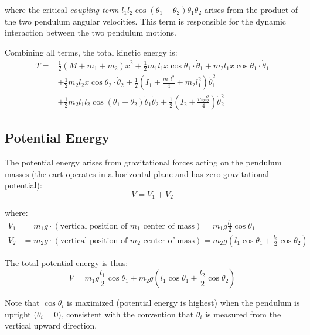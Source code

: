 where the critical \textit{coupling term} $l_1 l_2 \cos(\theta_1 - \theta_2) \dot{\theta}_1 \dot{\theta}_2$ arises from the product of the two pendulum angular velocities. This term is responsible for the dynamic interaction between the two pendulum motions.

Combining all terms, the total kinetic energy is:
\begin{align}
T = &\frac{1}{2}(M + m_1 + m_2)\dot{x}^2 + \frac{1}{2}m_1 l_1 \dot{x} \cos\theta_1 \cdot \dot{\theta}_1 + m_2 l_1 \dot{x} \cos\theta_1 \cdot \dot{\theta}_1 \nonumber \\
&+ \frac{1}{2}m_2 l_2 \dot{x} \cos\theta_2 \cdot \dot{\theta}_2 + \frac{1}{2}\left(I_1 + \frac{m_1 l_1^2}{4} + m_2 l_1^2\right)\dot{\theta}_1^2 \nonumber \\
&+ \frac{1}{2}m_2 l_1 l_2 \cos(\theta_1 - \theta_2)\dot{\theta}_1 \dot{\theta}_2 + \frac{1}{2}\left(I_2 + \frac{m_2 l_2^2}{4}\right)\dot{\theta}_2^2
\label{eq:kinetic_complete}
\end{align}

\subsection{Potential Energy}

The potential energy arises from gravitational forces acting on the pendulum masses (the cart operates in a horizontal plane and has zero gravitational potential):
\begin{equation}
V = V_1 + V_2
\label{eq:potential_total}
\end{equation}

where:
\begin{align}
V_1 &= m_1 g \cdot (\text{vertical position of } m_1 \text{ center of mass}) = m_1 g \frac{l_1}{2}\cos\theta_1 \label{eq:potential_pend1} \\
V_2 &= m_2 g \cdot (\text{vertical position of } m_2 \text{ center of mass}) = m_2 g \left( l_1\cos\theta_1 + \frac{l_2}{2}\cos\theta_2 \right) \label{eq:potential_pend2}
\end{align}

The total potential energy is thus:
\begin{equation}
V = m_1 g \frac{l_1}{2}\cos\theta_1 + m_2 g \left( l_1\cos\theta_1 + \frac{l_2}{2}\cos\theta_2 \right)
\label{eq:potential_complete}
\end{equation}

Note that $\cos\theta_i$ is maximized (potential energy is highest) when the pendulum is upright ($\theta_i = 0$), consistent with the convention that $\theta_i$ is measured from the vertical upward direction.

